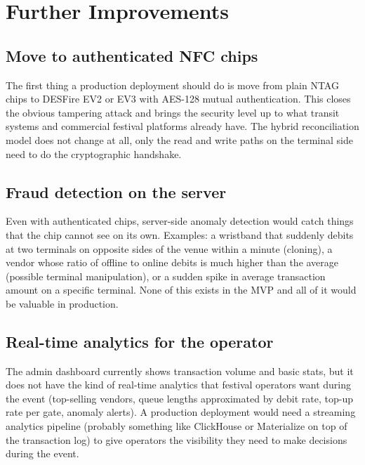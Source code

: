 \section{Further Improvements}
\label{sec:further-improvements}

\subsection{Move to authenticated NFC chips}
\label{subsec:improvement-secure-chip}

The first thing a production deployment should do is move from plain NTAG chips to DESFire EV2 or EV3 with AES-128 mutual authentication. This closes the obvious tampering attack and brings the security level up to what transit systems and commercial festival platforms already have. The hybrid reconciliation model does not change at all, only the read and write paths on the terminal side need to do the cryptographic handshake.

\subsection{Fraud detection on the server}
\label{subsec:improvement-fraud}

Even with authenticated chips, server-side anomaly detection would catch things that the chip cannot see on its own. Examples: a wristband that suddenly debits at two terminals on opposite sides of the venue within a minute (cloning), a vendor whose ratio of offline to online debits is much higher than the average (possible terminal manipulation), or a sudden spike in average transaction amount on a specific terminal. None of this exists in the MVP and all of it would be valuable in production.

\subsection{Real-time analytics for the operator}
\label{subsec:improvement-analytics}

The admin dashboard currently shows transaction volume and basic stats, but it does not have the kind of real-time analytics that festival operators want during the event (top-selling vendors, queue lengths approximated by debit rate, top-up rate per gate, anomaly alerts). A production deployment would need a streaming analytics pipeline (probably something like ClickHouse or Materialize on top of the transaction log) to give operators the visibility they need to make decisions during the event.

